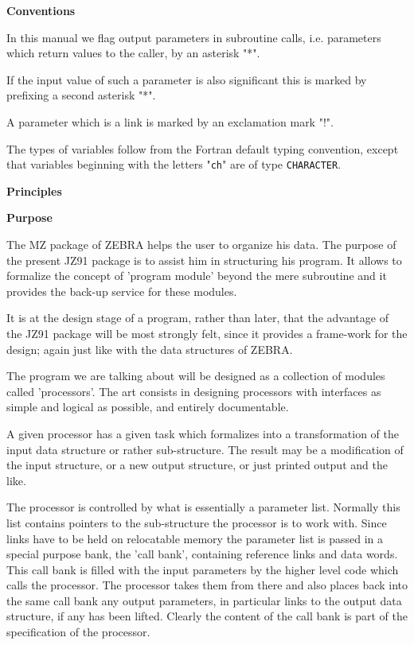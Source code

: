 \vspace*{80mm}
\begin{center} {\large\bf Conventions} \end{center}

In this manual we flag output parameters in subroutine calls,
i.e. parameters which return values to the caller,
by an asterisk "*".

If the input value of such a parameter is also significant
this is marked by prefixing a second asterisk "*".

A parameter which is a link is marked by an exclamation mark "!".

The types of variables follow from the Fortran default typing
convention, except that variables beginning with the letters
"{\tt ch}" are of type {\tt CHARACTER}.

\cleardoublepage  %
\begin{center}
  {\large\bf{Principles}}\\
\end{center}
\lspa

\vspace*{2pt}
{\large\bf Purpose}

The MZ package of ZEBRA helps the user to organize his data.
The purpose of the present JZ91 package is to assist him
in structuring his program.
It allows to formalize the concept of 'program module'
beyond the mere subroutine
and it provides the back-up service for these modules.

It is at the design stage of a program,
rather than later,
that the advantage of the JZ91 package will be most strongly felt,
since it provides a frame-work for the design;
again just like with the data structures of ZEBRA.

The program we are talking about will be designed as
a collection of modules called 'processors'.
The art consists in designing processors with interfaces
as simple and logical as possible,
and entirely documentable.

A given processor has a given task
which formalizes into a transformation of the input data structure
or rather sub-structure.
The result may be a modification of the input structure,
or a new output structure,
or just printed output and the like.

The processor is controlled by what is essentially a parameter list.
Normally this list contains pointers to the sub-structure
the processor is to work with.
Since links have to be held on relocatable memory
the parameter list is passed in a special purpose bank,
the 'call bank',
containing reference links and data words.
This call bank is filled with the input parameters
by the higher level code which calls the processor.
The processor takes them from there and also places back
into the same call bank any output parameters,
in particular links to the output data structure,
if any has been lifted.
Clearly the content of the call bank is part of
the specification of the processor.


